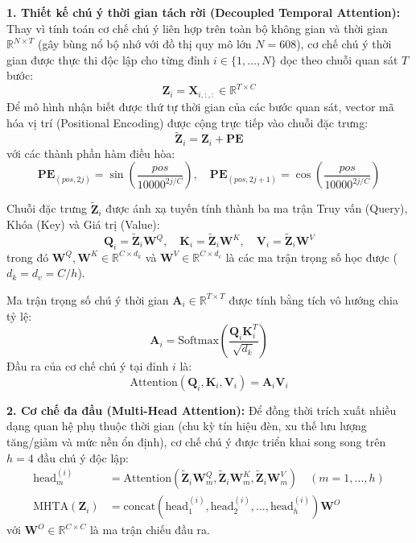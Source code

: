 \textbf{1. Thiết kế chú ý thời gian tách rời (Decoupled Temporal Attention):}
Thay vì tính toán cơ chế chú ý liên hợp trên toàn bộ không gian và thời gian $\mathbb{R}^{N \times T}$ (gây bùng nổ bộ nhớ với đồ thị quy mô lớn $N = 608$), cơ chế chú ý thời gian được thực thi độc lập cho từng đỉnh $i \in \{1, \dots, N\}$ dọc theo chuỗi quan sát $T$ bước:
\begin{equation}
    \mathbf{Z}_i = \mathbf{X}_{i, :, :} \in \mathbb{R}^{T \times C}
\end{equation}
Để mô hình nhận biết được thứ tự thời gian của các bước quan sát, vector mã hóa vị trí (Positional Encoding) được cộng trực tiếp vào chuỗi đặc trưng:
\begin{equation}
    \tilde{\mathbf{Z}}_i = \mathbf{Z}_i + \mathbf{PE}
\end{equation}
với các thành phần hàm điều hòa:
\begin{equation}
    \mathbf{PE}_{(pos, 2j)} = \sin\left(\frac{pos}{10000^{2j/C}}\right), \quad \mathbf{PE}_{(pos, 2j+1)} = \cos\left(\frac{pos}{10000^{2j/C}}\right)
\end{equation}

Chuỗi đặc trưng $\tilde{\mathbf{Z}}_i$ được ánh xạ tuyến tính thành ba ma trận Truy vấn (Query), Khóa (Key) và Giá trị (Value):
\begin{equation}
    \mathbf{Q}_i = \tilde{\mathbf{Z}}_i \mathbf{W}^Q, \quad \mathbf{K}_i = \tilde{\mathbf{Z}}_i \mathbf{W}^K, \quad \mathbf{V}_i = \tilde{\mathbf{Z}}_i \mathbf{W}^V
\end{equation}
trong đó $\mathbf{W}^Q, \mathbf{W}^K \in \mathbb{R}^{C \times d_k}$ và $\mathbf{W}^V \in \mathbb{R}^{C \times d_v}$ là các ma trận trọng số học được ($d_k = d_v = C / h$).

Ma trận trọng số chú ý thời gian $\mathbf{A}_i \in \mathbb{R}^{T \times T}$ được tính bằng tích vô hướng chia tỷ lệ:
\begin{equation}
    \mathbf{A}_i = \text{Softmax}\left( \frac{\mathbf{Q}_i \mathbf{K}_i^T}{\sqrt{d_k}} \right)
\end{equation}
Đầu ra của cơ chế chú ý tại đỉnh $i$ là:
\begin{equation}
    \text{Attention}(\mathbf{Q}_i, \mathbf{K}_i, \mathbf{V}_i) = \mathbf{A}_i \mathbf{V}_i
\end{equation}

\textbf{2. Cơ chế đa đầu (Multi-Head Attention):}
Để đồng thời trích xuất nhiều dạng quan hệ phụ thuộc thời gian (chu kỳ tín hiệu đèn, xu thế lưu lượng tăng/giảm và mức nền ổn định), cơ chế chú ý được triển khai song song trên $h = 4$ đầu chú ý độc lập:
\begin{align}
    \text{head}_m^{(i)} &= \text{Attention}(\tilde{\mathbf{Z}}_i \mathbf{W}_m^Q, \tilde{\mathbf{Z}}_i \mathbf{W}_m^K, \tilde{\mathbf{Z}}_i \mathbf{W}_m^V) \quad (m = 1, \dots, h) \\
    \text{MHTA}(\mathbf{Z}_i) &= \text{concat}\left( \text{head}_1^{(i)}, \text{head}_2^{(i)}, \dots, \text{head}_h^{(i)} \right) \mathbf{W}^O
\end{align}
với $\mathbf{W}^O \in \mathbb{R}^{C \times C}$ là ma trận chiếu đầu ra.

